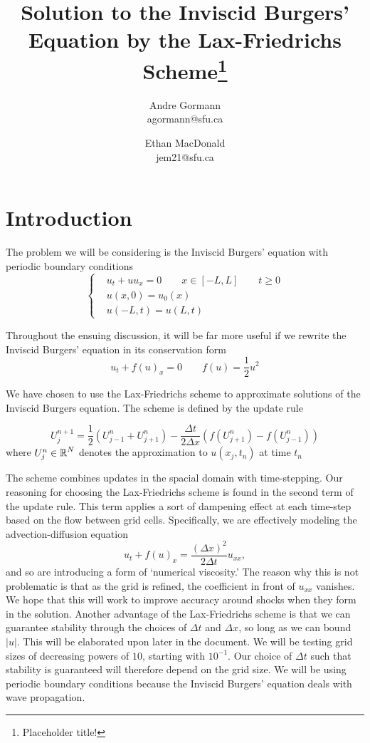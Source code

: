 \documentclass{myproject}
\title{\vspace*{-1cm}Solution to the Inviscid Burgers' Equation by the Lax-Friedrichs Scheme\footnote{Placeholder title!}}
\date{}
\author{
    Andre Gormann\\
    agormann@sfu.ca
    \and
    Ethan MacDonald\\
    jem21@sfu.ca
}
\begin{document}
\maketitle
\vspace*{-1cm}


\section{Introduction}

The problem we will be considering is the Inviscid Burgers' equation with periodic boundary conditions
\begin{equation}
    \begin{cases}
        & u_t + uu_x = 0 \qquad x \in [-L, L] \qquad t \geq 0 \\
        & u(x,0) = u_0(x) \\
        & u(-L,t) = u(L,t)
    \end{cases}
\end{equation}

Throughout the ensuing discussion, it will be far more useful if we rewrite the Inviscid Burgers' equation in its conservation form
\begin{equation}
    u_t + f(u)_x = 0 \qquad f(u) = \frac{1}{2}u^2
\end{equation}

We have chosen to use the Lax-Friedrichs scheme to approximate solutions of the Inviscid Burgers equation. The scheme is defined by the update rule

\[
    U_j^{n+1} = \frac{1}{2}\left( U_{j-1}^{n} + U_{j+1}^{n} \right) - \frac{\Delta t}{2\Delta x}\left( f(U_{j+1}^{n}) - f(U_{j-1}^{n}) \right)
\]
where $U_{j}^{n} \in \operatorname{\mathbb{R}}^N$ denotes the approximation to $u(x_j,t_n)$ at time $t_n$

The scheme combines updates in the spacial domain with time-stepping. Our reasoning for choosing the Lax-Friedrichs scheme is found in the second term of the update rule. This term applies a sort of dampening effect at each time-step based on the flow between grid cells. Specifically, we are effectively modeling the advection-diffusion equation
\[
    u_t + f(u)_x = \frac{(\Delta x)^2}{2\Delta t}u_{xx},
\]
and so are introducing a form of `numerical viscosity.' The reason why this is not problematic is that as the grid is refined, the coefficient in front of $u_{xx}$ vanishes. We hope that this will work to improve accuracy around shocks when they form in the solution. Another advantage of the Lax-Friedrichs scheme is that we can guarantee stability through the choices of ${\Delta t}$ and ${\Delta x}$, so long as we can bound $|u|$. This will be elaborated upon later in the document. We will be testing grid sizes of decreasing powers of $10$, starting with $10^{-1}$. Our choice of ${\Delta t}$ such that stability is guaranteed will therefore depend on the grid size. We will be using periodic boundary conditions because the Inviscid Burgers' equation deals with wave propagation.
\end{document}
